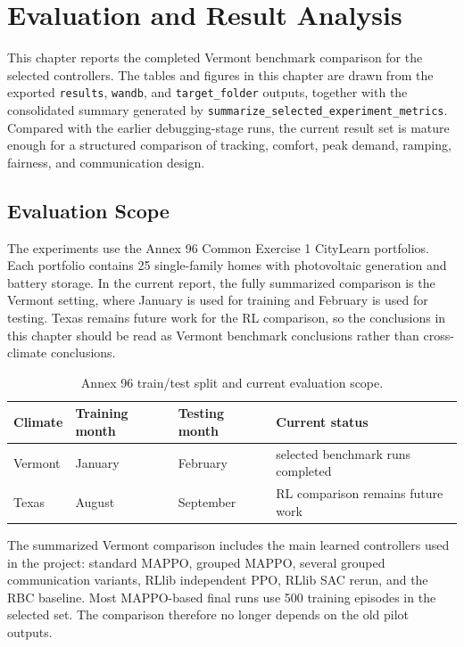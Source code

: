 ﻿\chapter{Evaluation and Result Analysis}\label{ch:eval}

This chapter reports the completed Vermont benchmark comparison for the selected
controllers. The tables and figures in this chapter are drawn from the exported
\texttt{results}, \texttt{wandb}, and \texttt{target\_folder} outputs, together
with the consolidated summary generated by
\texttt{summarize\_selected\_experiment\_metrics}. Compared with the earlier
debugging-stage runs, the current result set is mature enough for a structured
comparison of tracking, comfort, peak demand, ramping, fairness, and
communication design.

\section{Evaluation Scope}

The experiments use the Annex 96 Common Exercise 1 CityLearn portfolios. Each
portfolio contains 25 single-family homes with photovoltaic generation and
battery storage. In the current report, the fully summarized comparison is the
Vermont setting, where January is used for training and February is used for
testing. Texas remains future work for the RL comparison, so the conclusions in
this chapter should be read as Vermont benchmark conclusions rather than
cross-climate conclusions.

\begin{table}[h]
\begin{center}
\begin{tabular}{|l|l|l|l|}
\hline
Climate & Training month & Testing month & Current status \\
\hline
Vermont & January & February & selected benchmark runs completed \\
Texas & August & September & RL comparison remains future work \\
\hline
\end{tabular}
\end{center}
\caption{Annex 96 train/test split and current evaluation scope.}
\label{tab:split}
\end{table}

The summarized Vermont comparison includes the main learned controllers used in
the project: standard MAPPO, grouped MAPPO, several grouped communication
variants, RLlib independent PPO, RLlib SAC rerun, and the RBC baseline. Most
MAPPO-based final runs use 500 training episodes in the selected set. The
comparison therefore no longer depends on the old pilot outputs.

